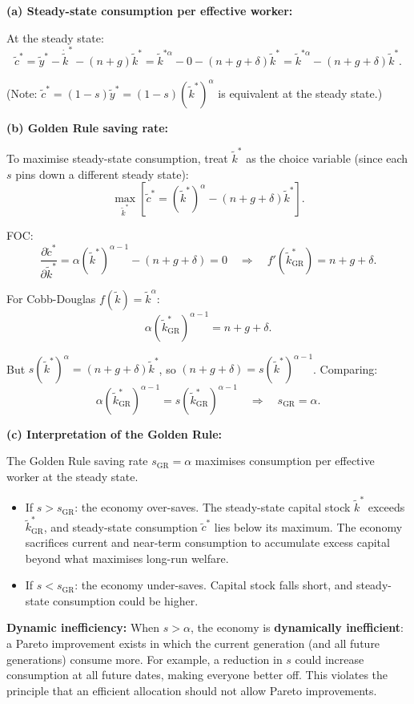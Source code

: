 \documentclass[a4paper,11pt]{article}
\newcommand{\ktilde}{\tilde{k}}
\newcommand{\ytilde}{\tilde{y}}
\newcommand{\ctilde}{\tilde{c}}
\begin{document}
\begin{answerbox}
\textbf{(a) Steady-state consumption per effective worker:}

At the steady state:
\[
    \ctilde^* = \ytilde^* - \dot{\ktilde}^* - (n+g)\ktilde^*
    = \ktilde^{*\alpha} - 0 - (n+g+\delta)\ktilde^*
    = \boxed{\ktilde^{*\alpha} - (n+g+\delta)\ktilde^*.}
\]

(Note: $\ctilde^* = (1-s)\ytilde^* = (1-s)(\ktilde^*)^\alpha$ is equivalent at the steady state.)

\textbf{(b) Golden Rule saving rate:}

To maximise steady-state consumption, treat $\ktilde^*$ as the choice variable (since each $s$ pins down a different steady state):
\[
    \max_{\ktilde^*} \left[\ctilde^* = (\ktilde^*)^\alpha - (n+g+\delta)\ktilde^*\right].
\]

FOC:
\[
    \frac{\partial \ctilde^*}{\partial \ktilde^*}
    = \alpha(\ktilde^*)^{\alpha-1} - (n+g+\delta) = 0
    \quad\Longrightarrow\quad
    \boxed{f'(\ktilde^*_{\mathrm{GR}}) = n+g+\delta.}
\]

For Cobb-Douglas $f(\ktilde) = \ktilde^\alpha$:
\[
    \alpha(\ktilde^*_{\mathrm{GR}})^{\alpha-1} = n+g+\delta.
\]

But $s(\ktilde^*)^\alpha = (n+g+\delta)\ktilde^*$, so $(n+g+\delta) = s(\ktilde^*)^{\alpha-1}$. Comparing:
\[
    \alpha(\ktilde^*_{\mathrm{GR}})^{\alpha-1} = s(\ktilde^*_{\mathrm{GR}})^{\alpha-1}
    \quad\Longrightarrow\quad
    \boxed{s_{\mathrm{GR}} = \alpha.}
\]

\textbf{(c) Interpretation of the Golden Rule:}

The Golden Rule saving rate $s_{\mathrm{GR}} = \alpha$ maximises consumption per effective worker at the steady state.

\begin{itemize}
    \item If $s > s_{\mathrm{GR}}$: the economy over-saves. The steady-state capital stock $\ktilde^*$ exceeds $\ktilde^*_{\mathrm{GR}}$, and steady-state consumption $\ctilde^*$ lies below its maximum. The economy sacrifices current and near-term consumption to accumulate excess capital beyond what maximises long-run welfare.

    \item If $s < s_{\mathrm{GR}}$: the economy under-saves. Capital stock falls short, and steady-state consumption could be higher.
\end{itemize}

\textbf{Dynamic inefficiency:} When $s > \alpha$, the economy is \textbf{dynamically inefficient}: a Pareto improvement exists in which the current generation (and all future generations) consume more. For example, a reduction in $s$ could increase consumption at all future dates, making everyone better off. This violates the principle that an efficient allocation should not allow Pareto improvements.
\end{answerbox}
\end{document}
